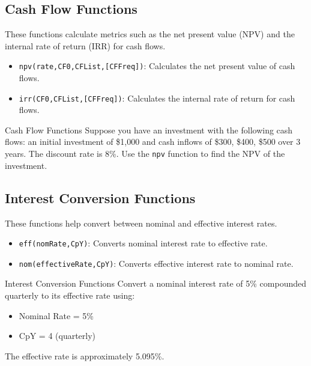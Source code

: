 \subsection{Cash Flow Functions}
These functions calculate metrics such as the net present value (NPV) and the internal rate of return (IRR) for cash flows.

\begin{itemize}
    \item \texttt{npv(rate,CF0,CFList,[CFFreq])}: Calculates the net present value of cash flows.
    \item \texttt{irr(CF0,CFList,[CFFreq])}: Calculates the internal rate of return for cash flows.
\end{itemize}

\begin{examplebox}{Cash Flow Functions}
Suppose you have an investment with the following cash flows: an initial investment of \$1,000 and cash inflows of \$300, \$400, \$500 over 3 years. The discount rate is 8\%. Use the \texttt{npv} function to find the NPV of the investment.
\end{examplebox}

\subsection{Interest Conversion Functions}
These functions help convert between nominal and effective interest rates.

\begin{itemize}
    \item \texttt{eff(nomRate,CpY)}: Converts nominal interest rate to effective rate.
    \item \texttt{nom(effectiveRate,CpY)}: Converts effective interest rate to nominal rate.
\end{itemize}

\begin{examplebox}{Interest Conversion Functions}
Convert a nominal interest rate of 5\% compounded quarterly to its effective rate using:
\begin{itemize}
    \item Nominal Rate = 5\%
    \item CpY = 4 (quarterly)
\end{itemize}
The effective rate is approximately 5.095\%.
\end{examplebox}

